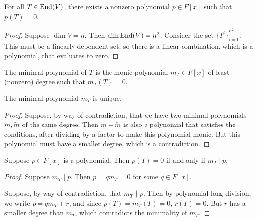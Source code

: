 \begin{lemma}
    For all \(T \in \operatorname{End}(V)\),
    there exists a nonzero polynomial \(p \in F[x]\) such that \(p(T) = 0\).
\end{lemma}
\begin{proof}
    Suppose \(\dim V = n\). Then \(\dim \operatorname{End}(V) = n^2\).
    Consider the set \({\{T^i\}}_{i=0}^{n^2}\).
    This must be a linearly dependent set,
    so there is a linear combination, which is a polynomial, that evaluates to zero.
\end{proof}
\begin{definition}
    The minimal polynomial of \(T\) is the monic polynomial \(m_T \in F[x]\)
    of least (nonzero) degree such that \(m_T(T) = 0\).
\end{definition}
\begin{proposition}
    The minimal polynomial \(m_T\) is unique.
\end{proposition}
\begin{proof}
    Suppose, by way of contradiction, that we have two minimal polynomials
    \(m,\tilde{m}\) of the same degree.
    Then \(m-\tilde{m}\) is also a polynomial that satisfies the conditions,
    after dividing by a factor to make this polynomial monic.
    But this polynomial must have a smaller degree, which is a contradiction.
\end{proof}
\begin{proposition}
    Suppose \(p \in F[x]\) is a polynomial.
    Then \(p(T) = 0\) if and only if \(m_T \mid p\).
\end{proposition}
\begin{proof}
    Suppose \(m_T \mid p\).
    Then \(p = q m_T = 0\) for some \(q \in F[x]\).

    Suppose, by way of contradiction, that \(m_T \nmid p\).
    Then by polynomial long division, we write \(p = q m_T + r\),
    and since \(p(T) = m_T(T) = 0\), \(r(T) = 0\).
    But \(r\) has a smaller degree than \(m_T\),
    which contradicts the minimality of \(m_T\).
\end{proof}

